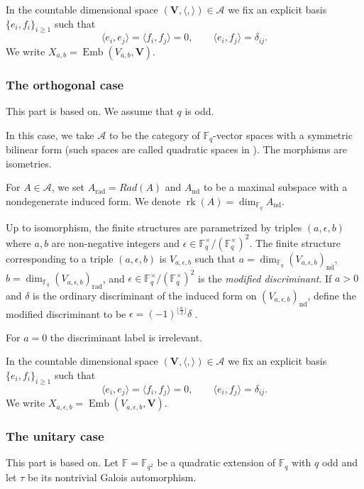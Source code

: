 \documentclass[11pt,a4paper]{amsart}
\theoremstyle{plain}%
\theoremstyle{definition}
\theoremstyle{remark}
\newcommand{\rk}{{\operatorname{rk}}}
\newcommand{\V}{\mathbf{V}}
\newcommand{\F}{{\mathbb F}}
\newcommand{\Emb}{\operatorname{Emb}}
\begin{document}
In the countable dimensional space $(\V, \langle, \rangle)\in \mathcal{A}$ we fix an explicit basis $\{e_i,f_i\}_{i\geq1}$ such that
\[
 \langle e_i,e_j\rangle=\langle f_i,f_j\rangle=0,
 \qquad \langle e_i,f_j\rangle=\delta_{ij}.
\]
 We write $X_{a,b}=\Emb(V_{a,b},\mathbf V)$. 


\subsubsection{The orthogonal case}\label{sec:orthogonal-structure}
This part is based on\cite[\S9.1]{HS-classical}. We assume that $q$ is odd. 



In this case, we take $\mathcal{A}$ to be the category of $\F_q$-vector spaces with a symmetric bilinear form (such spaces are called quadratic spaces in \cite{HS-classical}). The morphisms are isometries.

For $A\in \mathcal{A}$, we set $A_{\mathrm{rad}}=Rad(A)$ and $A_{\mathrm{nd}}$ to be a maximal subspace with a nondegenerate induced form. We denote $\rk(A)=\dim_{\F_q} A_{\mathrm{nd}}$.

Up to isomorphism, the finite structures are parametrized by triples $(a,\epsilon, b)$ where $a,b$ are non-negative integers and $\epsilon\in\F_q^\times/(\F_q^\times)^2$. The finite structure corresponding to a triple $(a,\epsilon, b)$ is $V_{a,\epsilon,b}$ such that $a=\dim_{\F_q} (V_{a,\epsilon, b})_{\mathrm{nd}}$, $b=\dim_{\F_q}(V_{a,\epsilon,b})_{\mathrm{rad}}$, and $\epsilon\in\F_q^\times/(\F_q^\times)^2$ is the \emph{modified discriminant}. If $a>0$ and $\delta$ is the ordinary discriminant of the induced form on $(V_{a,\epsilon, b})_{\mathrm{nd}}$, define the modified discriminant to be $\epsilon=(-1)^{\lfloor\frac{a}{2}\rfloor}\delta$ \cite[\S9.1]{HS-classical}. 
 
 For $a=0$ the discriminant label is irrelevant.

In the countable dimensional space $(\V, \langle, \rangle)\in \mathcal{A}$ we fix an explicit basis $\{e_i,f_i\}_{i\geq 1}$ such that 
\[
 \langle e_i,e_j\rangle=\langle f_i,f_j\rangle=0,
 \qquad \langle e_i,f_j\rangle={\delta_{ij}}.
\]
 We write $X_{a,\epsilon,b}=\Emb(V_{a,\epsilon,b},\mathbf V).$

\subsubsection{The unitary case}
This part is based on\cite[\S10.1]{HS-classical}. Let $\F = \F_{q^2}$ be a quadratic extension of $\F_q$ with $q$ odd and let $\tau$ be its nontrivial Galois automorphism.
 
\end{document}

